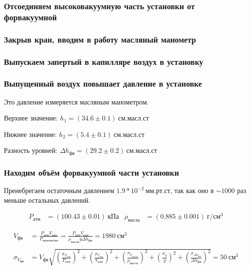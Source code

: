 \documentclass[a4paper, 12pt]{article}
\begin{document}
        \subsubsection{Отсоединяем высоковакуумную часть установки от форвакуумной}

        \subsubsection{Закрыв кран, вводим в работу масляный манометр}

        \subsubsection{Выпускаем запертый в капилляре воздух в установку}

        \subsubsection{Выпущенный воздух повышает давление в установке}

            Это давление измеряется масляным манометром.

            Верхнее значение: $h_1 = (34.6 \pm 0.1)~см.масл.ст$

            Нижнее значение:  $h_2 = (5.4 \pm 0.1)~см.масл.ст$

            Разность уровней: $\Delta h_{фв} = (29.2 \pm 0.2)~см.масл.ст$

        \subsubsection{Находим объём форвакуумной части установки}

            Пренебрегаем остаточным давлением $1.9*10^{-2}~мм.рт.ст$, так как оно в $\sim1000$ раз меньше остальных давлений.

            \begin{align*}
                P_{атм} &= (100.43 \pm 0.01)~кПа & \rho_{масла} &= (0.885 \pm 0.001)~г/см^3
            \end{align*}

            \begin{align*}
                V_{фв} &= \frac{P_{атм} V_{кап}}{P_{манометра}} = \frac{P_{атм} V_{кап}}{\rho_{масла} g \Delta h_{фв}} = 1980~см^3\\\\
                \sigma_{V_{фв}} &= V_{фв} \sqrt{\left( \frac{\sigma_{P_{атм}}}{P_{атм}} \right)^2 + \left( \frac{\sigma_{V_{кап}}}{V_{кап}} \right)^2 + \left( \frac{\sigma_{\rho_{масла}}}{\rho_{масла}} \right)^2 + \left( \frac{\sigma_{g}}{g} \right)^2 + \left( \frac{\sigma_{\Delta h_{фв}}}{\Delta h_{фв}} \right)^2} = 50~см^3
            \end{align*}
\end{document}
